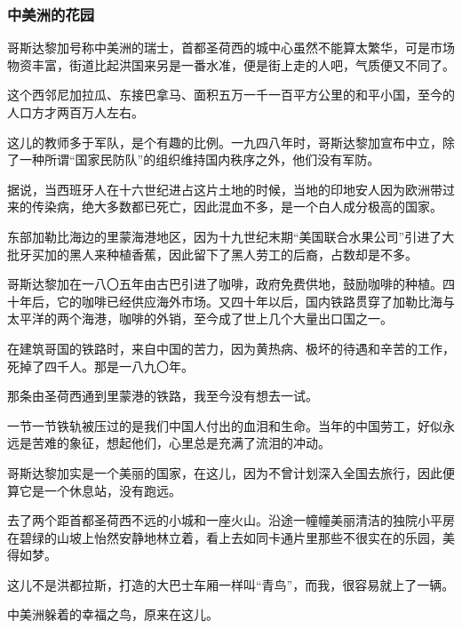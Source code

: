 \subsubsection*{中美洲的花园}
\par 哥斯达黎加号称中美洲的瑞士，首都圣荷西的城中心虽然不能算太繁华，可是市场物资丰富，街道比起洪国来另是一番水准，便是街上走的人吧，气质便又不同了。
\par 这个西邻尼加拉瓜、东接巴拿马、面积五万一千一百平方公里的和平小国，至今的人口方才两百万人左右。
\par 这儿的教师多于军队，是个有趣的比例。一九四八年时，哥斯达黎加宣布中立，除了一种所谓“国家民防队”的组织维持国内秩序之外，他们没有军防。
\par 据说，当西班牙人在十六世纪进占这片土地的时候，当地的印地安人因为欧洲带过来的传染病，绝大多数都已死亡，因此混血不多，是一个白人成分极高的国家。
\par 东部加勒比海边的里蒙海港地区，因为十九世纪末期“美国联合水果公司”引进了大批牙买加的黑人来种植香蕉，因此留下了黑人劳工的后裔，占数却是不多。
\par 哥斯达黎加在一八〇五年由古巴引进了咖啡，政府免费供地，鼓励咖啡的种植。四十年后，它的咖啡已经供应海外市场。又四十年以后，国内铁路贯穿了加勒比海与太平洋的两个海港，咖啡的外销，至今成了世上几个大量出口国之一。
\par 在建筑哥国的铁路时，来自中国的苦力，因为黄热病、极坏的待遇和辛苦的工作，死掉了四千人。那是一八九〇年。
\par 那条由圣荷西通到里蒙港的铁路，我至今没有想去一试。
\par 一节一节铁轨被压过的是我们中国人付出的血泪和生命。当年的中国劳工，好似永远是苦难的象征，想起他们，心里总是充满了流泪的冲动。
\par 哥斯达黎加实是一个美丽的国家，在这儿，因为不曾计划深入全国去旅行，因此便算它是一个休息站，没有跑远。
\par 去了两个距首都圣荷西不远的小城和一座火山。沿途一幢幢美丽清洁的独院小平房在碧绿的山坡上怡然安静地林立着，看上去如同卡通片里那些不很实在的乐园，美得如梦。
\par 这儿不是洪都拉斯，打造的大巴士车厢一样叫“青鸟”，而我，很容易就上了一辆。
\par 中美洲躲着的幸福之鸟，原来在这儿。
